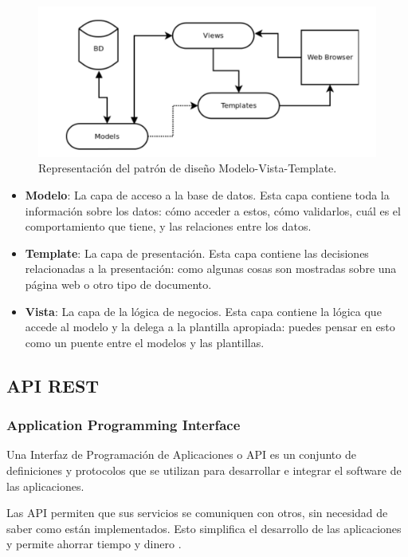\begin{figure}
    \centering
    \includegraphics[width=\textwidth]{capitulo2/images/mtv.png}
    \caption{Representación del patrón de diseño Modelo-Vista-Template.}
    \label{fig:mtv}
\end{figure}

\begin{itemize}
    \item \textbf{Modelo}: La capa de acceso a la base de datos. Esta capa contiene toda la información sobre los datos: cómo acceder a estos, cómo validarlos, cuál es el comportamiento que tiene, y las relaciones entre los datos.
    \item \textbf{Template}: La capa de presentación. Esta capa contiene las decisiones relacionadas a la presentación: como algunas cosas son mostradas sobre una página web o otro tipo de documento.
    \item \textbf{Vista}: La capa de la lógica de negocios. Esta capa contiene la lógica que accede al modelo y la delega a la plantilla apropiada: puedes pensar en esto como un puente entre el modelos y las plantillas.
\end{itemize}

\subsection{API REST}
\subsubsection{Application Programming Interface}
Una Interfaz de Programación de Aplicaciones o API es un conjunto de definiciones y protocolos que se utilizan para desarrollar e integrar el software de las aplicaciones.

Las API permiten que sus servicios se comuniquen con otros, sin necesidad de saber como están implementados. Esto simplifica el desarrollo de las aplicaciones y permite ahorrar tiempo y dinero \cite{apiArticle}.
